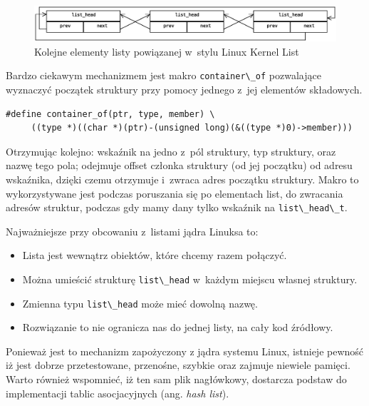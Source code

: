 \documentclass[a4paper,12pt,polish,oneside,openright]{thesis}
\newcommand\code[1]{\lstinline[style=line]{#1}}
\begin{document}
\begin{figure}[htb]
	\begin{center}
		\includegraphics[width=1.05\textwidth]{list_head.eps}
		\caption{Kolejne elementy listy powiązanej w~stylu Linux Kernel List}
	\end{center}
\end{figure}

Bardzo ciekawym mechanizmem jest makro \code{container\_of} pozwalające wyznaczyć początek struktury przy pomocy jednego z~jej elementów składowych.
\begin{lstlisting}[style=coden,caption=Definicja jednego z makr jądra linuksa: {container\_of}]
#define container_of(ptr, type, member) \
	 ((type *)((char *)(ptr)-(unsigned long)(&((type *)0)->member)))
\end{lstlisting}
Otrzymując kolejno: wskaźnik na jedno z~pól struktury, typ struktury, oraz nazwę tego pola; odejmuje offset członka struktury (od jej początku) od adresu wskaźnika, dzięki czemu otrzymuje i~zwraca adres początku struktury\cite{lkl2}.
Makro to wykorzystywane jest podczas poruszania się po elementach list, do zwracania adresów struktur, podczas gdy mamy dany tylko wskaźnik na \code{list\_head\_t}.

Najważniejsze przy obcowaniu z~listami jądra Linuksa to:
\begin{itemize}
	\item Lista jest wewnątrz obiektów, które chcemy razem połączyć.
	\item Można umieścić strukturę \code{list\_head} w~każdym miejscu własnej struktury.
	\item Zmienna typu \code{list\_head} może mieć dowolną nazwę.
	\item Rozwiązanie to nie ogranicza nas do jednej listy, na cały kod źródłowy.
\end{itemize}
Ponieważ jest to mechanizm zapożyczony z jądra systemu Linux, istnieje pewność iż jest dobrze przetestowane, przenośne, szybkie oraz zajmuje niewiele pamięci.
Warto również wspomnieć, iż ten sam plik nagłówkowy, dostarcza podstaw do implementacji tablic asocjacyjnych (ang. \emph{hash list}).
\end{document}
